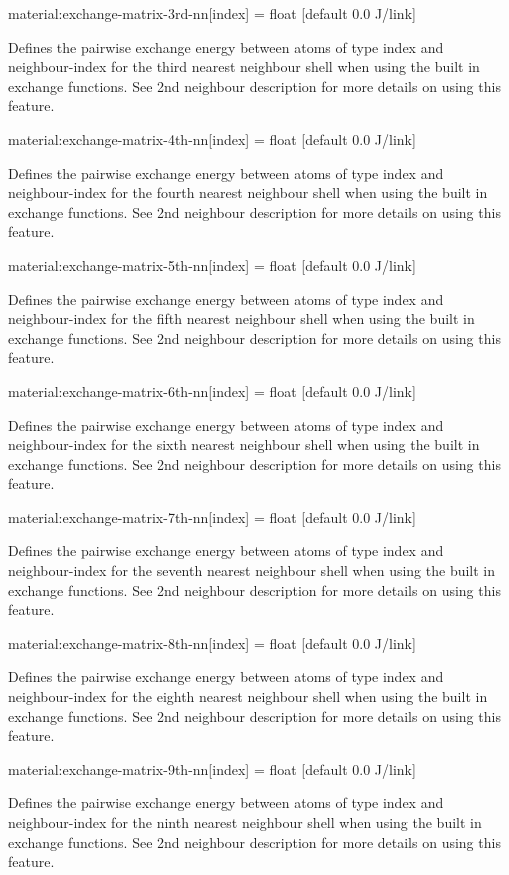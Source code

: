 {\zicf material:exchange-matrix-3rd-nn[index] = float [default 0.0 J/link]}
 Defines the
pairwise exchange energy between atoms of type index and neighbour-index for the
third nearest neighbour shell when using the built in exchange functions. See
2nd neighbour description for more details on using this feature.

{\zicf material:exchange-matrix-4th-nn[index] = float [default 0.0 J/link]}
Defines the pairwise exchange energy between atoms of type index and
neighbour-index for the fourth nearest neighbour shell when using the built in
exchange functions. See 2nd neighbour description for more details on using this feature.


{\zicf material:exchange-matrix-5th-nn[index] = float [default 0.0 J/link]}
Defines the pairwise exchange energy between atoms of type index and
neighbour-index for the fifth nearest neighbour shell when using the built in
exchange functions. See 2nd neighbour description for more details on using this feature.


{\zicf material:exchange-matrix-6th-nn[index] = float [default 0.0 J/link]}
Defines the pairwise exchange energy between atoms of type index and
neighbour-index for the sixth nearest neighbour shell when using the built in
exchange functions. See 2nd neighbour description for more details on using this feature.


{\zicf material:exchange-matrix-7th-nn[index] = float [default 0.0 J/link]}
Defines the pairwise exchange energy between atoms of type index and
neighbour-index for the seventh nearest neighbour shell when using the built in
exchange functions. See 2nd neighbour description for more details on using this feature.


{\zicf material:exchange-matrix-8th-nn[index] = float [default 0.0 J/link]}
Defines the pairwise exchange energy between atoms of type index and
neighbour-index for the eighth nearest neighbour shell when using the built in
exchange functions. See 2nd neighbour description for more details on using this feature.


{\zicf material:exchange-matrix-9th-nn[index] = float [default 0.0 J/link]}
Defines the pairwise exchange energy between atoms of type index and
neighbour-index for the ninth nearest neighbour shell when using the built in
exchange functions. See 2nd neighbour description for more details on using this feature.


